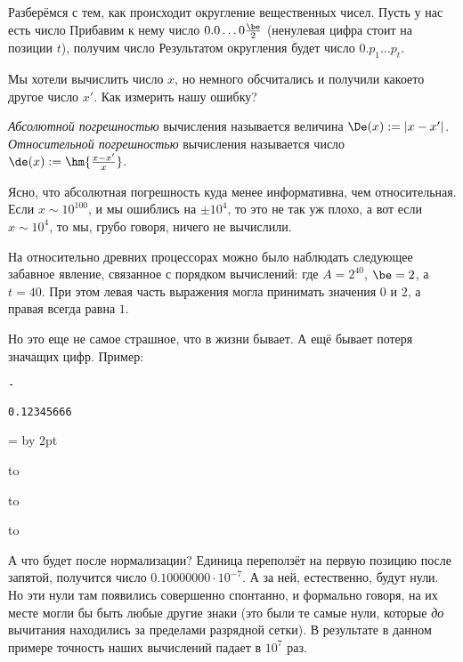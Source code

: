 \documentclass[a4paper]{article}
\begin{document}
Разберёмся с тем, как происходит округление вещественных чисел. Пусть у нас есть число
Прибавим к нему число $0.0\dots0\frac\be2$ (ненулевая цифра стоит на позиции $t$), получим число
Результатом округления будет число $0.p_1\dots p_t$.

Мы хотели вычислить число $x$, но немного обсчитались и получили какое\д то другое число $x'$. Как измерить нашу ошибку?

\begin{df}
\emph{Абсолютной погрешностью} вычисления называется величина $\De(x) := |x-x'|$. \emph{Относительной погрешностью} вычисления называется
число $\de(x) := \hm{\frac{x-x'}{x}}$.
\end{df}

Ясно, что абсолютная погрешность куда менее информативна, чем относительная. Если $x\sim 10^{100}$, и мы ошиблись на $\pm10^{4}$,
то это не так уж плохо, а вот если $x \sim 10^{4}$, то мы, грубо говоря, ничего не вычислили.

\begin{note}
На относительно древних процессорах можно было наблюдать следующее забавное явление, связанное с порядком вычислений:
где $A = 2^{40}$, $\be=2$, а $t=40$. При этом левая часть выражения могла принимать значения $0$ и $2$, а правая всегда равна $1$.
\end{note}

Но это еще не самое страшное, что в жизни бывает. А ещё бывает потеря значащих цифр. Пример:


\newbox\plusbox
\setbox\plusbox\hbox{\texttt{-}}

\newbox\digitbox
\setbox\digitbox\hbox{\texttt{0.12345666}}

\medskip

{\baselineskip=\ht\digitbox
\advance\baselineskip by 2pt
\centerline{\hbox to \wd{}}%
\centerline{\hbox to \wd{}}%
\centerline{\hbox to \wd{}}}

\smallskip

А что будет после нормализации? Единица переползёт на первую позицию после запятой, получится число $0.10000000\cdot 10^{-7}$.
А за ней, естественно, будут нули. Но эти нули там появились совершенно спонтанно, и формально говоря, на их месте могли
бы быть любые другие знаки (это были те самые нули, которые \emph{до} вычитания находились за пределами разрядной сетки).
В результате в данном примере точность наших вычислений падает в $10^7$ раз.
\end{document}
